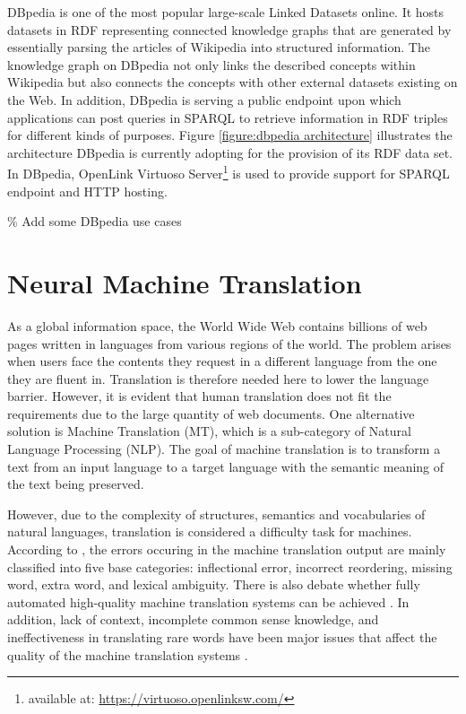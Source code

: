 DBpedia is one of the most popular large-scale Linked Datasets online. It hosts datasets in RDF representing connected knowledge graphs that are generated by essentially parsing the articles of Wikipedia into structured information. The knowledge graph on DBpedia not only links the described concepts within Wikipedia but also connects the concepts with other external datasets existing on the Web. In addition, DBpedia is serving a public endpoint upon which applications can post queries in SPARQL to retrieve information in RDF triples for different kinds of purposes. Figure \ref{figure:dbpedia architecture} illustrates the architecture DBpedia is currently adopting for the provision of its RDF data set. In DBpedia, OpenLink Virtuoso Server\footnote{available at: \url{https://virtuoso.openlinksw.com/}} is used to provide support for SPARQL endpoint and HTTP hosting.

\% Add some DBpedia use cases





\section{Neural Machine Translation} \label{section:neural machine translation}
As a global information space, the World Wide Web contains billions of web pages written in languages from various regions of the world. The problem arises when users face the contents they request in a different language from the one they are fluent in. Translation is therefore needed here to lower the language barrier. However, it is evident that human translation does not fit the requirements due to the large quantity of web documents. One alternative solution is Machine Translation (MT), which is a sub-category of Natural Language Processing (NLP). The goal of machine translation is to transform a text from an input language to a target language with the semantic meaning of the text being preserved.

However, due to the complexity of structures, semantics and vocabularies of natural languages, translation is considered a difficulty task for machines. According to \cite{Popovic2012}, the errors occuring in the machine translation output are mainly classified into five base categories: inflectional error, incorrect reordering, missing word, extra word, and lexical ambiguity. There is also debate whether fully automated high-quality machine translation systems can be achieved \cite{bar1964language}. In addition, lack of context, incomplete common sense knowledge, and ineffectiveness in translating rare words have been major issues that affect the quality of the machine translation systems \cite{okpor2014machine} \cite{Wu2016}.

